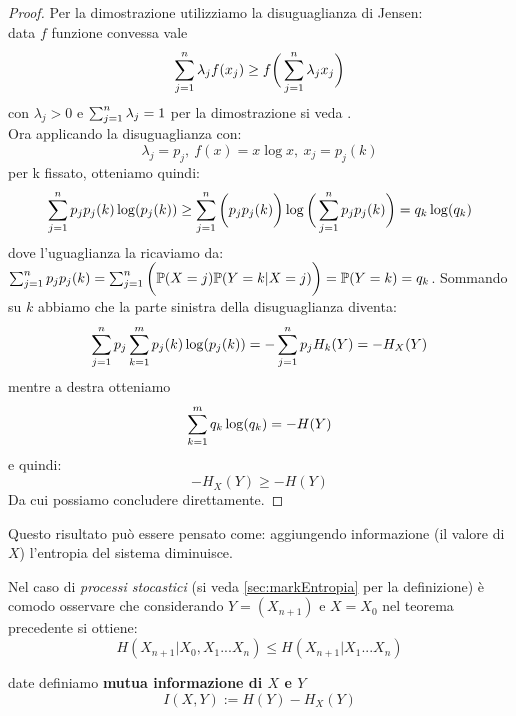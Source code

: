\begin{proof}
Per la dimostrazione utilizziamo la disuguaglianza di Jensen:\\
data $f$ funzione convessa vale
\begin{equation}
\sum_{j=1}^n \lambda_j f(x_j)\geq f\bigg( \sum_{j=1}^n \lambda_j x_j \bigg)
\end{equation}
con $\lambda_j > 0$ e $\sum_{j=1}^n \lambda_j =1$
per la dimostrazione si veda \cite{Jensen}.\\
Ora applicando la disuguaglianza con:
$$\lambda_j=p_j,\ f(x)=x \log x, \  x_j=p_j(k)$$
per k fissato, otteniamo quindi:
$$\sum_{j=1}^n p_j p_j(k)\log (p_j(k))\geq \sum_{j=1}^n \bigg( p_j p_j(k) \bigg) \log \bigg( \sum_{j=1}^n p_j p_j(k) \bigg)=q_k \log (q_k)$$
dove l'uguaglianza la ricaviamo da: $\sum_{j=1}^n p_j p_j(k)=\sum_{j=1}^n \bigg( \mathbb{P}(X=j) \mathbb{P}(Y=k|X=j) \bigg)= \mathbb{P}(Y=k)= q_k$.
Sommando su $k$ abbiamo che la parte sinistra della disuguaglianza diventa:
$$\sum_{j=1}^n  p_j \sum_{k=1}^m p_j(k) \log (p_j(k))=-\sum_{j=1}^n p_j H_k(Y)=-H_X(Y)$$
mentre a destra otteniamo
$$\sum_{k=1}^m q_k \log (q_k)= -H(Y)$$
e quindi:
\begin{equation}
-H_X(Y) \geq -H(Y)
\end{equation}
Da cui possiamo concludere direttamente.
\end{proof}
Questo risultato può essere pensato come: aggiungendo informazione (il valore di $X$) l'entropia del sistema diminuisce.
\begin{oss}\label{oss:disugShannon}
Nel caso di \textit{processi stocastici} (si veda \ref{sec:markEntropia} per la definizione) è comodo osservare che considerando $Y=(X_{n+1})$ e $X=X_0$ nel teorema precedente si ottiene:
$$H(X_{n+1}|X_0,X_1...X_n) \leq H(X_{n+1}|X_1...X_n)$$
\end{oss}
\begin{defi} \label{defin:mutua}
date \var definiamo \textbf{mutua informazione di $X$ e $Y$}
\begin{equation} \label{defi:mutua}
I(X,Y):=H(Y)-H_X(Y)
\end{equation}
\end{defi}

